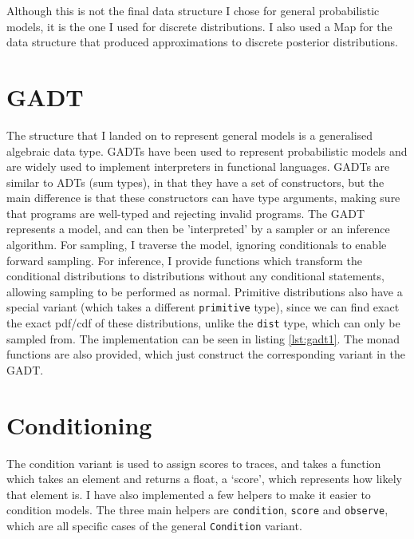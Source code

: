 

Although this is not the final data structure I chose for general probabilistic models, it is the one I used for discrete distributions. I also used a Map for the data structure that produced approximations to discrete posterior distributions.

\section{GADT}

The structure that I landed on to represent general models is a generalised algebraic data type. GADTs have been used to represent probabilistic models \cite{scibior2015practical} and are widely used to implement interpreters in functional languages. GADTs are similar to ADTs (sum types), in that they have a set of constructors, but the main difference is that these constructors can have type arguments, making sure that programs are well-typed and rejecting invalid programs. The GADT represents a model, and can then be 'interpreted' by a sampler or an inference algorithm. For sampling, I traverse the model, ignoring conditionals to enable forward sampling. For inference, I provide functions which transform the conditional distributions to distributions without any conditional statements, allowing sampling to be performed as normal. Primitive distributions also have a special variant (which takes a different \texttt{primitive} type), since we can find exact the exact pdf/cdf of these distributions, unlike the \texttt{dist} type, which can only be sampled from. The implementation can be seen in listing \ref{lst:gadt1}. The monad functions are also provided, which just construct the corresponding variant in the GADT.



\section{Conditioning}

The condition variant is used to assign scores to traces, and takes a function which takes an element and returns a float, a `score', which represents how likely that element is. I have also implemented a few helpers to make it easier to condition models. The three main helpers are \texttt{condition}, \texttt{score} and \texttt{observe}, which are all specific cases of the general \texttt{Condition} variant. 


